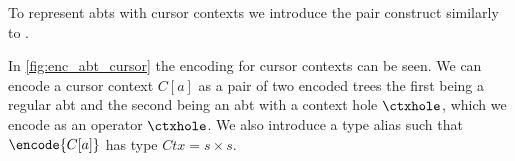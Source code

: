 \documentclass[sigplan,review]{acmart}
\newcommand{\abt}{\textsf{abt}\xspace}
\begin{document}
To represent {\abt}s with cursor contexts we introduce the pair construct similarly to \cite{types_programming_languages}.


In \cref{fig:enc_abt_cursor} the encoding for cursor contexts can be seen. We can encode a cursor context $C[a]$ as a pair of two encoded trees the first being a regular \abt and the second being an \abt with a context hole $\ctxhole$, which we encode as an operator $\ctxhole$. We also introduce a type alias such that $\encode{C[a]}$ has type $Ctx = s \times s$.

\end{document}
